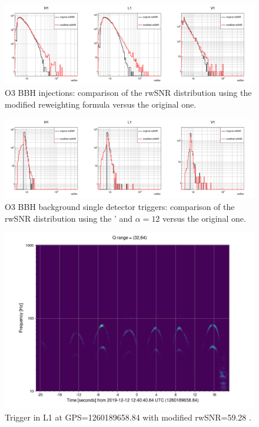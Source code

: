 \begin{figure}[ht]
    \centering
    \includegraphics[width=\textwidth]{sectionImprovement/rwSNR/cRwSnr_a12.png}
    \caption{O3 BBH injections: comparison of the rwSNR distribution using the modified reweighting formula versus the original one.}
    \label{fig:new_rwsnr_inj}
\end{figure}
\begin{figure}[ht]
    \centering
    \includegraphics[width=\textwidth]{sectionImprovement/rwSNR/cRwSnr_singles_a12.png}
    \caption{O3 BBH background single detector triggers: comparison of the rwSNR distribution using the ' and $\alpha=12$ versus the original one.}
    \label{fig:new_rwsnr_singles}
\end{figure}
\begin{figure}[ht]
  \centering
  \includegraphics[width=0.5\linewidth]{sectionImprovement/rwSNR/1260189658.84_1.png}
  \caption{Trigger in L1 at GPS=1260189658.84 with modified rwSNR=59.28 .}
  \label{fig:trig30}
\end{figure}




